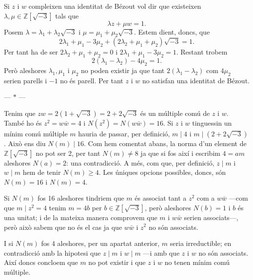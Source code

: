 \documentclass[12pt]{article}
\newcommand{\Z}{\mathbb{Z}}
\newcommand{\R}{\Z[\sqrt{-3}]}
\newcommand{\parbreak}{
	\begin{center}
		--- $\ast$ ---
	\end{center} 
}
\begin{document}
Si \( z \) i \( w \) compleixen una identitat de Bézout vol dir que existeixen \( \lambda, \mu \in \R \) tals que 
\begin{equation*}
	\lambda z + \mu w = 1.
\end{equation*}
Posem \( \lambda = \lambda_1 + \lambda_2\sqrt{-3} \) i \( \mu = \mu_1 + \mu_2 \sqrt{-3} \). Estem dient, doncs, que 
\begin{equation*}
	2\lambda_1 + \mu_1 -3\mu_2 + (2 \lambda_2 + \mu_1 + \mu_2)\sqrt{-3} = 1.
\end{equation*}
Per tant ha de ser \( 2\lambda_2 + \mu_1 + \mu_2 = 0 \) i \( 2\lambda_1 + \mu_1 - 3\mu_2 = 1 \). Restant trobem
\begin{equation*}
	2(\lambda_1 - \lambda_2) - 4\mu_2 = 1. 
\end{equation*}
Però aleshores \( \lambda_1, \mu_1 \) i \( \mu_2  \) no poden existir ja que tant \( 2(\lambda_1 - \lambda_2) \) com \( 4\mu_2 \) serien parells i \( -1 \) no és parell. Per tant \( z \) i \( w \) no satisfan una identitat de Bézout.  

\parbreak

Tenim que \( zw = 2(1 + \sqrt{-3}) = 2 + 2 \sqrt{-3} \) és un múltiple comú de \( z \) i \( w \). També ho és \( z^2 = w \bar{w} = 4 \) i \( N(z^2) = N(w \bar{w}) = 16 \). Si \( z \) i \( w \) tinguessin un mínim comú múltiple \( m \) hauria de passar, per definició, \( m \mid 4 \) i \( m \mid (2 + 2\sqrt{-3}) \). Això ens diu \( N(m) \mid 16 \). Com hem comentat abans, la norma d'un element de \( \R \) no pot ser 2, per tant \( N(m) \neq 8 \) ja que si fos així i escribim \( 4 = am \) aleshores \( N(a) = 2 \): una contradicció. A més, com que, per definició, \( z \mid m \) i \( w \mid m \) hem de tenir \( N(m) \geq 4 \). Les úniques opcions possibles, doncs, són \( N(m) = 16 \) i \( N(m) = 4 \).

Si \( N(m) \) fos 16 aleshores tindriem que \( m \) és associat tant a \( z^2 \) com a \( w\bar{w} \) ---com que \( m \mid z^2 = 4 \) tenim \( m = 4b \) per \( b \in \R \), però aleshores \( N(b) = 1 \) i \( b \) és una unitat; i de la mateixa manera comprovem que \( m \) i \( w\bar{w} \) serien associats---, però això sabem que no és el cas ja que \( w\bar{w} \) i \( z^2 \) no són associats.  

I si \( N(m) \) fos 4 aleshores, per un apartat anterior, \( m \) seria irreductible; en contradicció amb la hipotesi que \( z \mid m \) i \( w \mid m \) ---i amb que \( z \) i \( w \) no són associats. Així doncs concloem que \( m \) no pot existir i que \( z \) i \( w \) no tenen mínim comú múltiple.   
\end{document}
